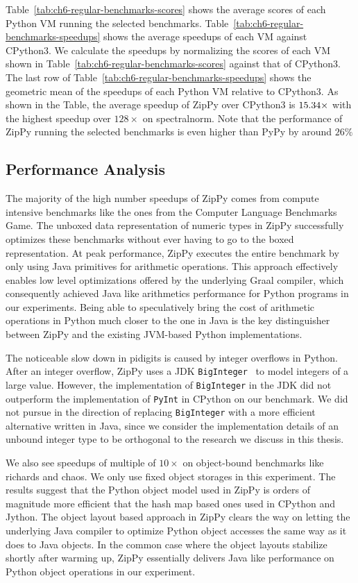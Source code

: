 Table~\ref{tab:ch6-regular-benchmarks-scores} shows the average scores of each Python VM running the selected benchmarks.
Table~\ref{tab:ch6-regular-benchmarks-speedups} shows the average speedups of each VM against CPython3.
We calculate the speedups by normalizing the scores of each VM shown in Table~\ref{tab:ch6-regular-benchmarks-scores} against that of CPython3.
The last row of Table~\ref{tab:ch6-regular-benchmarks-speedups} shows the geometric mean of the speedups of each Python VM relative to CPython3.
As shown in the Table, the average speedup of ZipPy over CPython3 is $15.34{}\times$ with the highest speedup over $128\times$ on \textsf{spectralnorm}.
Note that the performance of ZipPy running the selected benchmarks is even higher than PyPy by around $26\%$

\subsection{Performance Analysis}

The majority of the high number speedups of ZipPy comes from compute intensive benchmarks like the ones from the Computer Language Benchmarks Game.
The unboxed data representation of numeric types in ZipPy successfully optimizes these benchmarks without ever having to go to the boxed representation.
At peak performance, ZipPy executes the entire benchmark by only using Java primitives for arithmetic operations.
This approach effectively enables low level optimizations offered by the underlying Graal compiler, which consequently achieved Java like arithmetics performance for Python programs in our experiments.
Being able to speculatively bring the cost of arithmetic operations in Python much closer to the one in Java is the key distinguisher between ZipPy and the existing JVM-based Python implementations.

The noticeable slow down in \textsf{pidigits} is caused by integer overflows in Python.
After an integer overflow, ZipPy uses a JDK \texttt{BigInteger}~\cite{hotspot} to model integers of a large value.
However, the implementation of \texttt{BigInteger} in the JDK did not outperform the implementation of \texttt{PyInt} in CPython on our benchmark.
We did not pursue in the direction of replacing \texttt{BigInteger} with a more efficient alternative written in Java, since we consider the implementation details of an unbound integer type to be orthogonal to the research we discuss in this thesis.

We also see speedups of multiple of $10\times$ on object-bound benchmarks like \textsf{richards} and \textsf{chaos}.
We only use fixed object storages in this experiment.
The results suggest that the Python object model used in ZipPy is orders of magnitude more efficient that the hash map based ones used in CPython and Jython.
The object layout based approach in ZipPy clears the way on letting the underlying Java compiler to optimize Python object accesses the same way as it does to Java objects.
In the common case where the object layouts stabilize shortly after warming up, ZipPy essentially delivers Java like performance on Python object operations in our experiment.


